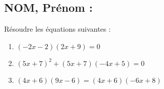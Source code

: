 \documentclass[a4paper,11pt,exos]{nsi}
\begin{document}
\subsection*{NOM, Prénom : \dotfill} 


\maketitle



\begin{exercice}
Résoudre les équations suivantes :
	\begin{enumerate}
		\item $(-2x-2)(2x+9)=0$
        \item $(5x+7)^{2}+(5x+7)(-4x+5)=0$ 
	    \item $(4x+6)(9x-6)=(4x+6)(-6x+8)$
	\end{enumerate}

\end{exercice}

\end{document}
